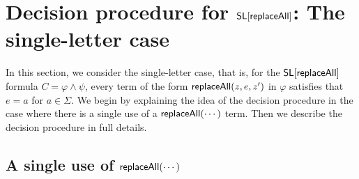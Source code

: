 

\section{Decision procedure for $\mathsf{SL}[\mathsf{replaceAll}]$: The single-letter case} \label{sec:replaceallsl}








In this section, we consider the single-letter case, that is, for the $\mathsf{SL}[\mathsf{replaceAll}]$ formula $C = \varphi \wedge \psi$, every term of the form $\mathsf{replaceAll}(z, e, z')$ in $\varphi$ satisfies that $e=a$ for $a \in \Sigma$.
We begin by explaining the idea of the decision procedure in the case where there is a single use of a $\mathsf{replaceAll}(\cdots)$ term.
Then we describe the decision procedure in full details.



\subsection{A single use of $\mathsf{replaceAll}(\cdots)$}

